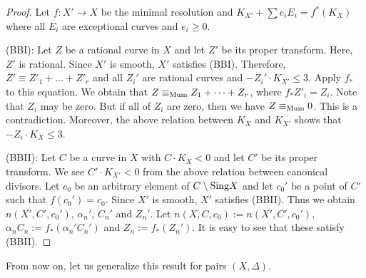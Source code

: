 \documentclass[12pt,twoside]{amsart}
\theoremstyle{definition}
\begin{document}
\begin{proof}
Let $f:X' \to X$ be the minimal resolution and 
$K_{X'}+\sum{e_i E_i}=f^*(K_X)$ where 
all $E_i$ are exceptional curves and $e_i \geq 0$.

(BBI): Let $Z$ be a rational curve in $X$ and 
let $Z'$ be its proper transform. 
Here, $Z'$ is rational. 
Since $X'$ is smooth, $X'$ satisfies (BBI). 
Therefore, $Z' \equiv Z'_1+ \dots +Z'_r$ and 
all $Z_i'$ are rational curves and $-Z_i'\cdot K_{X'} \leq 3$. 
Apply $f_*$ to this equation. 
We obtain that $Z \equiv_{\rm Mum} Z_1+ \dots +Z_r$, where $f_*Z'_i=Z_i$. 
Note that $Z_i$ may be zero. 
But if all of $Z_i$ are zero, then we have $Z \equiv_{\rm Mum} 0$. 
This is a contradiction. 
Moreover, the above relation between $K_X$ and $K_{X'}$ shows that 
$-Z_i\cdot K_X \leq 3$.

(BBII): Let $C$ be a curve in $X$ with $C\cdot K_X<0$ and 
let $C'$ be its proper transform. 
We see $C'\cdot K_{X'}<0$ from the above relation between canonical divisors. 
Let $c_0$ be an arbitrary element of $C \setminus {\rm Sing} X$ and 
let $c_0'$ be a point of $C'$ such that $f(c_0')=c_0$. 
Since $X'$ is smooth, $X'$ satisfies (BBII). 
Thus we obtain $n(X', C', c_0')$, 
$\alpha_n'$, $C_n'$ and $Z_n'$. 
Let $n(X, C, c_0):=n(X', C', c_0')$, 
$\alpha_nC_n:=f_*(\alpha_n'C_n')$ and $Z_n:=f_*(Z_n')$. 
It is easy to see that these satisfy (BBII). 
\end{proof}

From now on, let us generalize this result for pairs $(X, \Delta)$.
\end{document}
